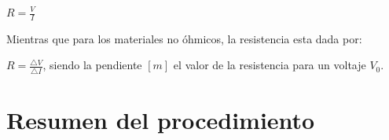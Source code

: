 \documentclass[letterpaper, 12pt]{report}
\begin{document}
$R = \frac{V}{I}$

\vspace{.5cm}

Mientras que para los materiales no óhmicos, la resistencia esta
dada por:

$R = \frac{\triangle V}{\triangle I}$, siendo la pendiente $[m]$ el valor
de la resistencia para un voltaje $V_0$.

\section{Resumen del procedimiento}


\newpage

\end{document}
